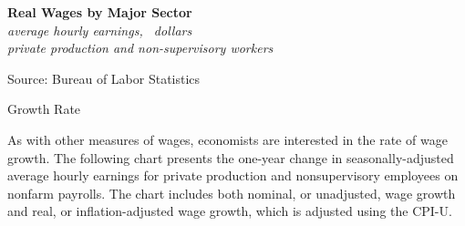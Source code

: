 \documentclass{report}
\makeatletter
\newcommand{\tbllink}[1]{\href{https://raw.githubusercontent.com/bdecon/US-chartbook/master/chartbook/data/#1}{\faTable}}
\newcommand*\short[1]{\expandafter\@gobbletwo\number\numexpr#1\relax}
\newcommand{\absnode}[3]{\node[below right, align=left] at (axis cs: #1,#2) {#3};}
\newcommand{\shdateaxisticks}{
		date coordinates in=x, axis line style={draw=none},
		xmax={2024-01-31},
		max space between ticks=40,	    
		xtick={{1990-01-01}, {1995-01-01}, {2000-01-01}, 
			{2005-01-01}, {2010-01-01}, {2015-01-01}, {2020-01-01}},
		minor xtick={},
		enlarge y limits={0.06}, enlarge x limits={0.01},
		xticklabel style={align=center, yshift=-2pt}, tick label style={inner sep=0pt},
		}
\newcommand{\stdline}[4]{\addplot[very thick, no markers, color=#1] 
		table [x=#2, y=#3, col sep=comma] {#4};	}
\newcommand{\thickline}[4]{\addplot[ultra thick, no markers, color=#1] 
		table [x=#2, y=#3, col sep=comma] {#4};	}
\newcommand{\rbars}{
		\fill[color=black!10] (axis cs:{1990-07-01},\pgfkeysvalueof{/pgfplots/ymin})
			rectangle (axis cs:{1991-03-01}, \pgfkeysvalueof{/pgfplots/ymax});
		\fill[color=black!10] (axis cs:{2007-12-01},\pgfkeysvalueof{/pgfplots/ymin})
			rectangle (axis cs:{2009-07-01}, \pgfkeysvalueof{/pgfplots/ymax});
		\fill[color=black!10] (axis cs:{2001-03-01},\pgfkeysvalueof{/pgfplots/ymin})
			rectangle (axis cs:{2001-11-01}, \pgfkeysvalueof{/pgfplots/ymax});
		\fill[color=black!10] (axis cs:{2020-02-01},\pgfkeysvalueof{/pgfplots/ymin})
			rectangle (axis cs:{2020-05-01}, \pgfkeysvalueof{/pgfplots/ymax});}
\makeatother
\begin{document}
{\begin{minipage}{0.4\textwidth}
\normalsize \textbf{Real Wages by Major Sector}\\
\footnotesize{\textit{average hourly earnings, \unskip \ dollars}}\\
\footnotesize{\textit{private production and non-supervisory workers}}
\vspace{3.1cm}

\hspace{2mm} 

\footnotesize{Source: Bureau of Labor Statistics} \hfill \tbllink{real_ahe.csv}
\end{minipage} \hspace{6mm}
\begin{minipage}{0.31\textwidth}
\small 
\end{minipage}
\vspace{4mm}

\begin{minipage}{1.0\textwidth} 
\normalsize{Growth Rate}
\vspace*{-1mm}

\small As with other measures of wages, economists are interested in the rate of wage growth. The following chart presents the one-year change in seasonally-adjusted average hourly earnings for private production and nonsupervisory employees on nonfarm payrolls. The chart includes both nominal, or unadjusted, wage growth and real, or inflation-adjusted wage growth, which is adjusted using the CPI-U.




\vspace{1mm}


\end{minipage}}
\end{document}

